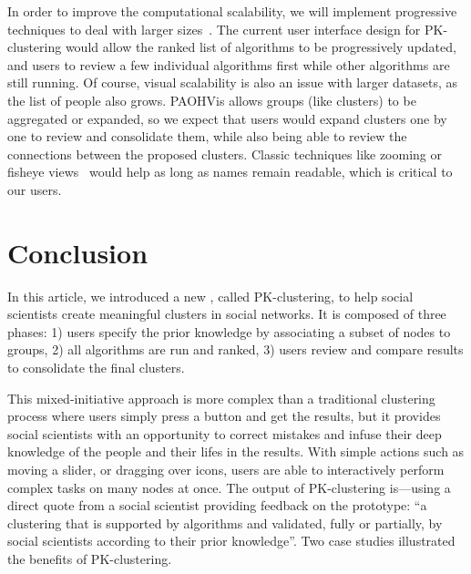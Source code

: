 
In order to improve the computational scalability, we will implement progressive techniques to deal with larger sizes~\cite{Progressive}.
The current user interface design for PK-clustering would allow the ranked list of algorithms to be progressively updated, and users to review a few individual algorithms first while other algorithms are still running.  Of course, visual scalability is also an issue with larger datasets, as the list of people also grows.
PAOHVis allows groups (like clusters) to be aggregated or expanded, so we expect that users would expand clusters one by one to review and consolidate them, while also being able to review the connections between the proposed clusters.  
Classic techniques like zooming or fisheye views~\cite{Jakobsen06-fisheye, rao94} would help as long as names remain readable, which is critical to our users.

\section{Conclusion}

In this article, we introduced a new , called PK-clustering, to help social scientists create meaningful clusters in social networks. It is composed of three phases: 1) users specify the prior knowledge by associating a subset of nodes to groups, 2) all algorithms are run and ranked, 3)  users review and compare results to consolidate the final clusters.

This mixed-initiative approach is more complex than a traditional clustering process where users simply press a button and get
the results, but it provides social scientists with an opportunity to correct mistakes and infuse their deep knowledge of the people and their lifes in the results. With simple actions such as moving a slider, or dragging over icons, users are able to interactively perform complex tasks on many nodes at once. The output of PK-clustering is---using a direct quote from a social scientist providing feedback on the prototype:  ``a clustering that is supported by algorithms and validated, fully or partially, by social scientists according to their prior knowledge''. Two case studies illustrated the benefits of PK-clustering.

